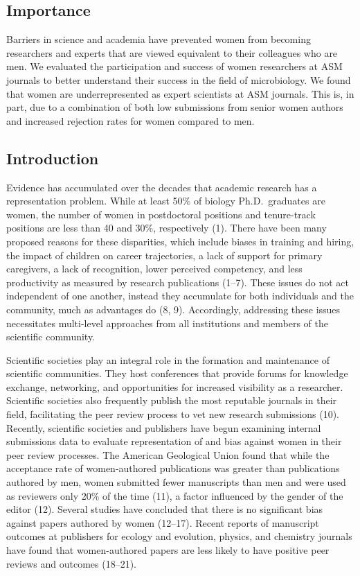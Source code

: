 \documentclass[11pt,]{article}
\begin{document}
\subsection{Importance}\label{importance}

Barriers in science and academia have prevented women from becoming
researchers and experts that are viewed equivalent to their colleagues
who are men. We evaluated the participation and success of women
researchers at ASM journals to better understand their success in the
field of microbiology. We found that women are underrepresented as
expert scientists at ASM journals. This is, in part, due to a
combination of both low submissions from senior women authors and
increased rejection rates for women compared to men.

\subsection{Introduction}\label{introduction}

Evidence has accumulated over the decades that academic research has a
representation problem. While at least 50\% of biology Ph.D.~graduates
are women, the number of women in postdoctoral positions and
tenure-track positions are less than 40 and 30\%, respectively (1).
There have been many proposed reasons for these disparities, which
include biases in training and hiring, the impact of children on career
trajectories, a lack of support for primary caregivers, a lack of
recognition, lower perceived competency, and less productivity as
measured by research publications (1--7). These issues do not act
independent of one another, instead they accumulate for both individuals
and the community, much as advantages do (8, 9). Accordingly, addressing
these issues necessitates multi-level approaches from all institutions
and members of the scientific community.

Scientific societies play an integral role in the formation and
maintenance of scientific communities. They host conferences that
provide forums for knowledge exchange, networking, and opportunities for
increased visibility as a researcher. Scientific societies also
frequently publish the most reputable journals in their field,
facilitating the peer review process to vet new research submissions
(10). Recently, scientific societies and publishers have begun examining
internal submissions data to evaluate representation of and bias against
women in their peer review processes. The American Geological Union
found that while the acceptance rate of women-authored publications was
greater than publications authored by men, women submitted fewer
manuscripts than men and were used as reviewers only 20\% of the time
(11), a factor influenced by the gender of the editor (12). Several
studies have concluded that there is no significant bias against papers
authored by women (12--17). Recent reports of manuscript outcomes at
publishers for ecology and evolution, physics, and chemistry journals
have found that women-authored papers are less likely to have positive
peer reviews and outcomes (18--21).
\end{document}
